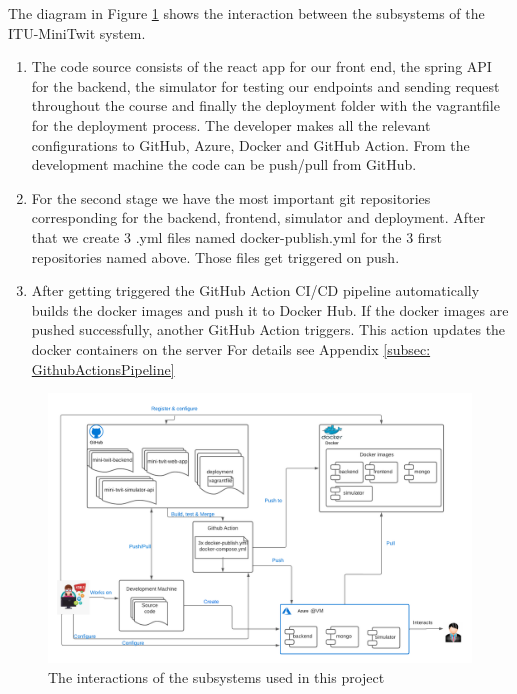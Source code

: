 
The diagram in Figure \ref{fig:systemInteraction} shows the interaction between the subsystems of the ITU-MiniTwit system.

\begin{enumerate}
    \item The code source consists of the react app for our front end, the spring API for the backend, the simulator for testing our endpoints and sending request throughout the course and finally the deployment folder with the vagrantfile for the deployment process.  The developer makes all the relevant configurations to GitHub, Azure, Docker and GitHub Action. From the development machine the code can be push/pull from GitHub.
    \item For the second stage we have the most important git repositories corresponding for the backend, frontend, simulator and deployment. After that we create 3 .yml files named docker-publish.yml for the 3 first repositories named above. Those files get triggered on push.
    \item After getting triggered the GitHub Action CI/CD pipeline automatically builds the docker images and push it to Docker Hub. If the docker images are pushed successfully, another GitHub Action triggers. This action updates the docker containers on the server For details see Appendix \ref{subsec: GithubActionsPipeline}
\end{enumerate}

\begin{figure}[h]
    \centering
    \includegraphics[width = \textwidth]{images/NewSystemInteraction.png}
    \caption{The interactions of the subsystems used in this project}
    \label{fig:systemInteraction}
\end{figure}